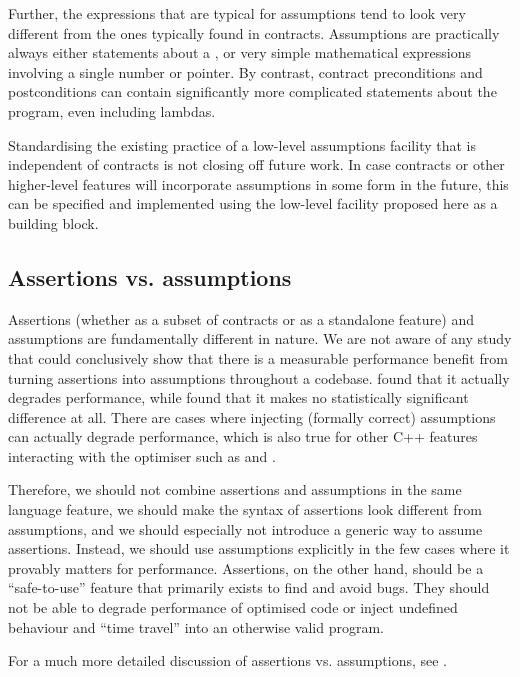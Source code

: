 Further, the expressions that are typical for assumptions tend to look very different from the ones typically found in contracts. Assumptions are practically always either statements about a , or very simple mathematical expressions involving a single number or pointer. By contrast, contract preconditions and postconditions can contain significantly more complicated statements about the program, even including lambdas.

Standardising the existing practice of a low-level assumptions facility that is independent of contracts is not closing off future work. In case contracts or other higher-level features will incorporate assumptions in some form in the future, this can be specified and implemented using the low-level facility proposed here as a building block.

\subsection{Assertions vs. assumptions}
\label{sec:assertions}

Assertions (whether as a subset of contracts or as a standalone feature) and assumptions are fundamentally different in nature. We are not aware of any study that could conclusively show that there is a measurable performance benefit from turning assertions into assumptions throughout a codebase. \cite{P2064R0} found that it actually degrades performance, while \cite{Amini2021} found that it makes no statistically significant difference at all. There are cases where injecting (formally correct) assumptions can actually degrade performance, which is also true for other C++ features interacting with the optimiser such as \tcode{[[likely]]} and \tcode{[[unlikely]]}.

Therefore, we should not combine assertions and assumptions in the same language feature, we should make the syntax of assertions look different from assumptions, and we should especially not introduce a generic way to assume assertions. Instead, we should use assumptions explicitly in the few cases where it provably matters for performance. Assertions, on the other hand, should be a ``safe-to-use'' feature that primarily exists to find and avoid bugs. They should not be able to degrade performance of optimised code or inject undefined behaviour and ``time travel'' into an otherwise valid program.

For a much more detailed discussion of assertions vs. assumptions, see \cite{P2064R0}.

